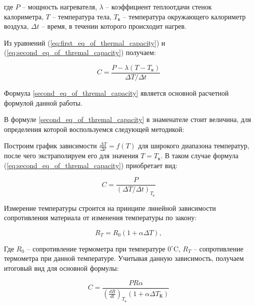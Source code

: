 \documentclass[a4paper, 12pt]{article}
\begin{document}
где $P$ -- мощность нагревателя, $\lambda$ -- коэффициент теплоотдачи стенок калориметра, $T$ -- температура тела, $T_{\text{к}}$ -- температура окружающего калориметр воздуха, $\Delta t$ -- время, в течении которого происходит нагрев.
 
Из уравнений (\ref{eq:first_eq_of_thermal_capacity}) и (\ref{eq:second_eq_of_thremal_capacity}) получаем:

\bigskip

\begin{equation} \label{second_eq_of_thremal_capacity}
    C = \frac{P - \lambda \left(T - T_{\text{к}} \right) }{\Delta T /\Delta t}
\end{equation}

\bigskip

Формула \eqref{second_eq_of_thremal_capacity} является основной расчетной формулой данной работы.

В формуле \eqref{second_eq_of_thremal_capacity} в знаменателе стоит величина, для определения которой воспользуемся следующей методикой:

Построим график зависимости $\displaystyle \frac{\Delta T}{\Delta t} = f \left( T \right)$ для широкого диапазона температур, после чего экстраполируем его для значения $T = T_{\text{к}}$. В таком случае формула (\ref{eq:second_eq_of_thremal_capacity}) приобретает вид:

\bigskip

\begin{equation}
	C = \frac{P}{\left( \Delta T / \Delta t \right)_{T_{\text{к}}}}
	\label{final_eq_for_capacity}
\end{equation}

\bigskip

Измерение температуры строится на принципе линейной зависимости сопротивления материала от изменения температуры по закону:

\bigskip

\begin{equation}
	R_{T} = R_{0} \left( 1 + \alpha \Delta T \right),
\end{equation}

\bigskip

Где $R_{0}$ -- сопротивление термометра при температуре $0^\circ$C, $R_{T}$ -- сопротивление термометра при данной температуре. Учитывая данную зависимость, получаем итоговый вид для основной формулы:

\bigskip

\begin{equation}
	C = \frac{PR\alpha}{\left( \frac{dR}{dt} \right)_{T_{\text{к}}}\left( 1 + \alpha \Delta T_{\text{К}} \right)}
	\label{capacity}
\end{equation}
\end{document}
